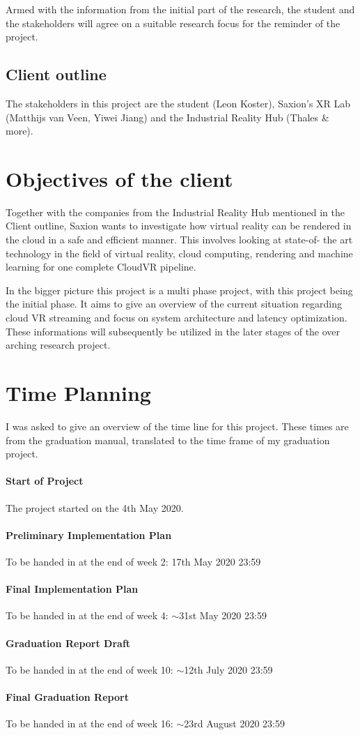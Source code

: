 \documentclass[]{article}
\begin{document}
Armed with the information from the initial part of the research, the student and the stakeholders will agree on a suitable research focus for the reminder of the project.
\subsection{Client outline}
The stakeholders in this project are the student (Leon Koster), Saxion's XR Lab (Matthijs van Veen, Yiwei Jiang) and the Industrial Reality Hub (Thales \& more).
\section{Objectives of the client}
Together with the companies from the Industrial Reality Hub mentioned in the Client outline, Saxion wants to investigate how virtual reality can be rendered in the cloud in a safe and efficient manner. This involves looking at state-of-
the art technology in the field of virtual reality, cloud computing, rendering and machine learning for one
complete CloudVR pipeline. 

In the bigger picture this project is a multi phase project, with this project being the initial phase. It aims to give an overview of the current situation regarding cloud VR streaming and focus on system architecture and latency optimization. These informations will subsequently be utilized in the later stages of the over arching research project.

\section{Time Planning}
I was asked to give an overview of the time line for this project. These times are from the graduation manual, translated to the time frame of my graduation project. 
\paragraph{Start of Project}
The project started on the 4th May 2020.
\paragraph{Preliminary Implementation Plan}
To be handed in at the end of week 2: 17th May 2020 23:59
\paragraph{Final Implementation Plan}
To be handed in at the end of week 4: $\sim$31st May 2020 23:59
\paragraph{Graduation Report Draft}
To be handed in at the end of week 10: $\sim$12th July 2020 23:59
\paragraph{Final Graduation Report}
To be handed in at the end of week 16: $\sim$23rd August 2020 23:59
\end{document}
